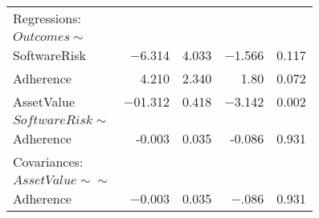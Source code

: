 \begin{table}
\begin{center}
\begin{tabular}{l|rrrr}
			Regressions:  & & & & \\  
			$Outcomes \sim$         & & & & \\                                     
			SoftwareRisk   &  $-$6.314 &   4.033 & $-$1.566 &   0.117 \\
			Adherence       &  4.210  & 2.340  &  1.80  &  0.072\\
			AssetValue     &   $-0$1.312  &  0.418  &  $-$3.142 &   0.002\\
			$SoftwareRisk \sim$        & & & & \\                                  
			Adherence     &    -0.003 &   0.035  &  -0.086 &   0.931\\
			Covariances:  & & & & \\  
			$AssetValue \sim\sim$          & & & & \\                                 
			Adherence     &    $-$0.003 &   0.035  &  $-$.086 &   0.931\\
		\end{tabular}
	\end{center}
\end{table}
